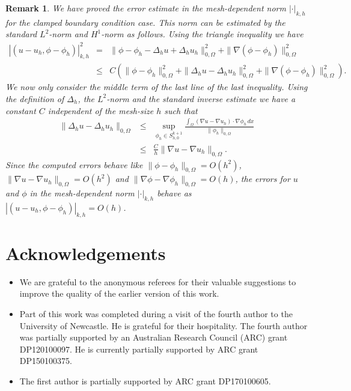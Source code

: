 \documentclass[a4paper,final]{siamltex}
\newtheorem{remark}[theorem]{Remark}
\def\snorm#1#2{|#1|_{#2}}
\begin{document}
\begin{remark}
We have proved the error estimate in the mesh-dependent norm $|\cdot |_{k,h}$ for the clamped boundary condition case. 
This norm can be estimated by the standard $L^2$-norm and $H^1$-norm as follows. 
Using the triangle inequality we have 
\begin{eqnarray*}
\snorm{(u-u_h,\phi-\phi_h)}{k,h}^2
&=& \|\phi -\phi_h - \Delta_h u + \Delta_h u_h\|^2_{0,\Omega} + \|\nabla (\phi- \phi_h)\|^2_{0,\Omega} \\
&\leq& C(  \|\phi -\phi_h \|^2_{0,\Omega} +\| \Delta_h u - \Delta_h u_h\|^2_{0,\Omega} +  \|\nabla (\phi- \phi_h)\|^2_{0,\Omega}).
\end{eqnarray*}
We now only consider the middle term of the last line  of the last inequality. 
Using  the definition of $\Delta_h$,  the  $L^2$-norm  and the standard inverse estimate we have a constant $C$ independent of 
the mesh-size $h$ such that 
\begin{eqnarray*} \| \Delta_h u - \Delta_h u_h\|_{0,\Omega} 
&\leq & 
\sup_{\phi_h \in S_{h,0}^{k+1}} \frac{\int_{\Omega} (\nabla u - \nabla u_h) \cdot \nabla \phi_h\,dx}{\|\phi_h\|_{0,\Omega}}\\
&\leq & \frac{C}{h} \|\nabla u - \nabla u_h\|_{0,\Omega}.
\end{eqnarray*}
Since the computed errors behave like   $\|\phi -\phi_h \|_{0,\Omega}=O(h^2) $,  $ \|\nabla u - \nabla u_h\|_{0,\Omega}=O(h^2)$ and 
 $\|\nabla \phi - \nabla \phi_h\|_{0,\Omega}=O(h)$, the errors for $u$ and $\phi$ in the mesh-dependent norm $|\cdot|_{k,h}$ behave as
   $\snorm{(u-u_h,\phi-\phi_h)}{k,h}=O(h)$.
\end{remark}


\section*{Acknowledgements}
\begin{itemize}
\item We are  grateful to the anonymous referees for their valuable suggestions 
to improve the quality of the earlier version of this work.

\item Part of this work was completed during a visit of the fourth author to the University of Newcastle. He is grateful for their hospitality.
The fourth author was partially supported by an Australian Research Council (ARC) grant DP120100097.
He is currently partially supported by ARC grant DP150100375.

\item The first author is partially supported by ARC grant DP170100605.
\end{itemize}
\end{document}

